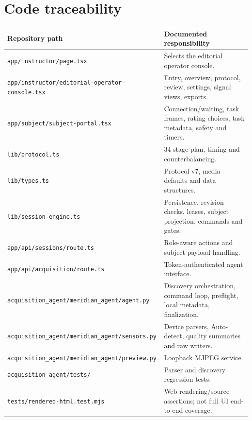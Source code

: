 \documentclass[11pt,a4paper]{article}
\newcommand{\code}[1]{{\small\nolinkurl{#1}}}
\begin{document}
\section{Code traceability}
\begin{longtable}{@{}L{.49\textwidth}L{.44\textwidth}@{}}
\toprule Repository path & Documented responsibility\\\midrule\endhead
\code{app/instructor/page.tsx} & Selects the editorial operator console.\\
\code{app/instructor/editorial-operator-console.tsx} & Entry, overview, protocol, review, settings, signal views, exports.\\
\code{app/subject/subject-portal.tsx} & Connection/waiting, task frames, rating choices, task metadata, safety and timers.\\
\code{lib/protocol.ts} & 34-stage plan, timing and counterbalancing.\\
\code{lib/types.ts} & Protocol v7, media defaults and data structures.\\
\code{lib/session-engine.ts} & Persistence, revision checks, leases, subject projection, commands and gates.\\
\code{app/api/sessions/route.ts} & Role-aware actions and subject payload handling.\\
\code{app/api/acquisition/route.ts} & Token-authenticated agent interface.\\
\code{acquisition_agent/meridian_agent/agent.py} & Discovery orchestration, command loop, preflight, local metadata, finalization.\\
\code{acquisition_agent/meridian_agent/sensors.py} & Device parsers, Auto-detect, quality summaries and raw writers.\\
\code{acquisition_agent/meridian_agent/preview.py} & Loopback MJPEG service.\\
\code{acquisition_agent/tests/} & Parser and discovery regression tests.\\
\code{tests/rendered-html.test.mjs} & Web rendering/source assertions; not full UI end-to-end coverage.\\
\bottomrule
\end{longtable}
\end{document}
